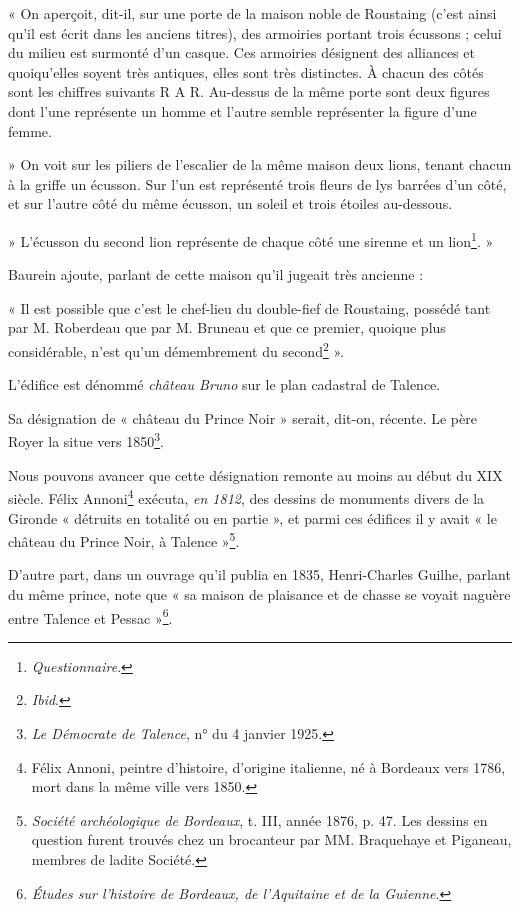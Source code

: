 « On aperçoit, dit-il, sur une porte de la maison noble de Roustaing (c'est ainsi qu'il est écrit dans les anciens titres), des armoiries portant trois écussons ; celui du milieu est surmonté d'un casque. Ces armoiries désignent des alliances et quoiqu'elles soyent très antiques, elles sont très distinctes. À chacun des côtés sont les chiffres suivants R A R. Au-dessus de la même porte sont deux figures dont l'une représente un homme et l'autre semble représenter la figure d'une femme.

» On voit sur les piliers de l'escalier de la même maison deux lions, tenant chacun à la griffe un écusson. Sur l'un est représenté trois fleurs de lys barrées d'un côté, et sur l'autre côté du même écusson, un soleil et trois étoiles au-dessous.

» L'écusson du second lion représente de chaque côté une sirenne et un lion\footnote{\textit{Questionnaire}.}. »

Baurein ajoute, parlant de cette maison qu'il jugeait très ancienne :

« Il est possible que c'est le chef-lieu du double-fief de Roustaing, possédé tant par M. Roberdeau que par M. Bruneau et que ce premier, quoique plus considérable, n'est qu'un démembrement du second\footnote{\textit{Ibid}.} ».

L'édifice est dénommé \textit{château Bruno} sur le plan cadastral de Talence.

Sa désignation de « château du Prince Noir » serait, dit-on, récente. Le père Royer la situe vers 1850\footnote{\textit{Le Démocrate de Talence}, n° du 4 janvier 1925.}.

Nous pouvons avancer que cette désignation remonte au moins au début du XIX\ieme{} siècle. Félix Annoni\footnote{Félix Annoni, peintre d'histoire, d'origine italienne, né à Bordeaux vers 1786, mort dans la même ville vers 1850.} exécuta, \textit{en 1812}, des dessins de monuments divers de la Gironde « détruits en totalité ou en partie », et parmi ces édifices il y avait « le château du Prince Noir, à Talence »\footnote{\textit{Société archéologique de Bordeaux}, t. III, année 1876, p. 47. Les dessins en question furent trouvés chez un brocanteur par MM. Braquehaye et Piganeau, membres de ladite Société.}.

D'autre part, dans un ouvrage qu'il publia en 1835, Henri-Charles Guilhe, parlant du même prince, note que « sa maison de plaisance et de chasse se voyait naguère entre Talence et Pessac »\footnote{\textit{Études sur l'histoire de Bordeaux, de l'Aquitaine et de la Guienne}.}.

